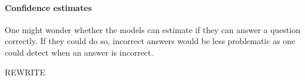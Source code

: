 \documentclass[11pt, oneside]{article}
\begin{document}
\begin{refsection}
\paragraph{Confidence estimates} One might wonder whether the models can estimate if they can answer a question correctly. 
If they could do so, incorrect answers would be less problematic as one could detect when an answer is incorrect.

REWRITE 




\end{refsection}
\end{document}
